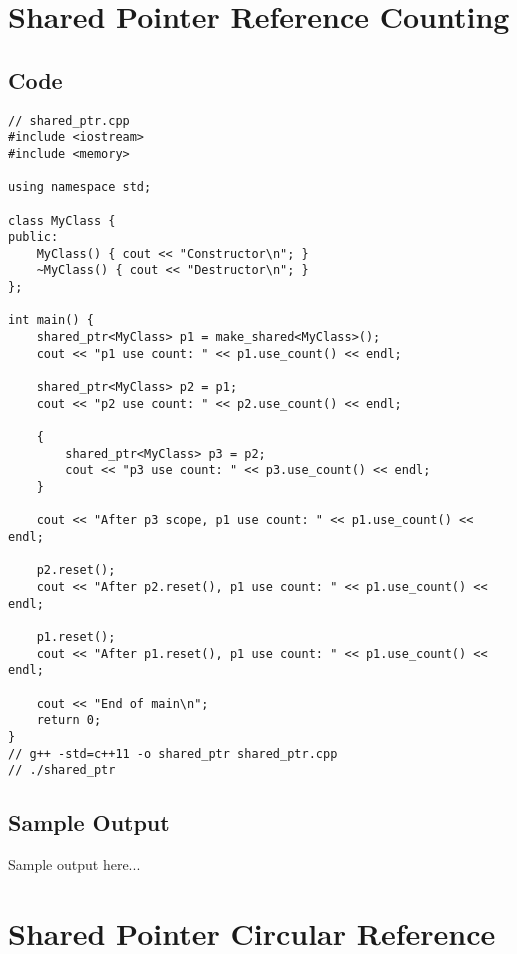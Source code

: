 \documentclass[12pt]{article}
\begin{document}
\section*{Shared Pointer Reference Counting}

\subsection*{Code}
\begin{Verbatim}[fontsize=\small,frame=single]
// shared_ptr.cpp
#include <iostream>
#include <memory>

using namespace std;

class MyClass {
public:
    MyClass() { cout << "Constructor\n"; }
    ~MyClass() { cout << "Destructor\n"; }
};

int main() {
    shared_ptr<MyClass> p1 = make_shared<MyClass>();
    cout << "p1 use count: " << p1.use_count() << endl;

    shared_ptr<MyClass> p2 = p1;
    cout << "p2 use count: " << p2.use_count() << endl;

    {
        shared_ptr<MyClass> p3 = p2;
        cout << "p3 use count: " << p3.use_count() << endl;
    }

    cout << "After p3 scope, p1 use count: " << p1.use_count() << endl;

    p2.reset();
    cout << "After p2.reset(), p1 use count: " << p1.use_count() << endl;

    p1.reset();
    cout << "After p1.reset(), p1 use count: " << p1.use_count() << endl;

    cout << "End of main\n";
    return 0;
}
// g++ -std=c++11 -o shared_ptr shared_ptr.cpp
// ./shared_ptr
\end{Verbatim}

\subsection*{Sample Output}
\begin{tcolorbox}[colback=black!5!white,colframe=black!75!white]
Sample output here...
\end{tcolorbox}
\newpage

\section*{Shared Pointer Circular Reference}
\end{document}
